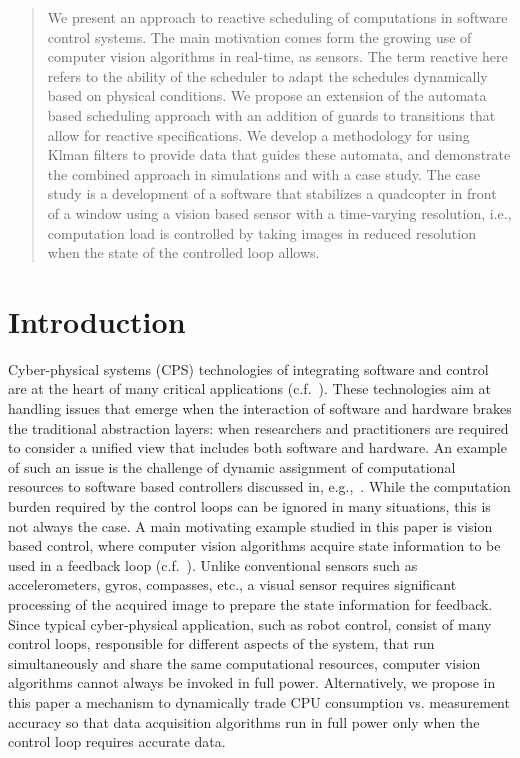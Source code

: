 \documentclass{sig-alternate-ipsn13}
\begin{document}
\maketitle
\begin{abstract}
We present an approach to reactive scheduling of computations in software control systems. The main motivation comes form the growing use of computer vision algorithms in real-time, as sensors. The term reactive here refers to the ability of the scheduler to adapt the schedules dynamically based on physical conditions. We propose an extension of the automata based scheduling approach with an addition of guards to transitions that allow for reactive specifications. We develop a methodology for using Klman filters to provide data that guides these automata, and demonstrate the combined approach in simulations and with a case study. The case study is a development of a software that stabilizes a quadcopter in front of a window using a vision based sensor with a time-varying resolution, i.e., computation load is controlled by taking images in reduced resolution when the state of the controlled loop allows.
\end{abstract}

\section{Introduction}
Cyber-physical systems (CPS) technologies of integrating software and control are at the heart of many critical applications (c.f.~\cite{lee2008cyber}). 
These technologies aim at handling issues that emerge when the interaction of software and hardware brakes the traditional abstraction layers: when researchers and practitioners are required to consider a unified view that includes both software and hardware. An example of such an issue is the challenge of dynamic assignment of computational resources to software based controllers discussed in, e.g.,~\cite{arzen2000introduction,tabuada2007event,weiss2007automata}. While the computation burden required by the control loops can be ignored in many situations, this is not always the case. A main motivating example studied in this paper is vision based control, where computer vision algorithms acquire state information to be used in a feedback loop (c.f.~\cite{das2002vision,shakernia1999landing,Efraim2017}). Unlike conventional sensors such as accelerometers, gyros, compasses, etc., a visual sensor requires significant processing of the acquired image to prepare the state information for feedback. Since typical cyber-physical application, such as robot control, consist of many control loops, responsible for different aspects of the system, that run simultaneously and share the same computational resources, computer vision algorithms cannot always be invoked in full power. Alternatively, we propose in this paper a mechanism to dynamically trade CPU consumption vs. measurement accuracy so that data acquisition algorithms run in full power only when the control loop requires accurate data. 
\end{document}

